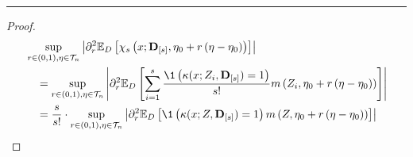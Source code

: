 \hrule

\begin{lem}
    
\end{lem}

\begin{proof}
    \begin{equation}
        \begin{aligned}
            & \sup_{r \in(0,1), \eta \in \mathcal{T}_{n}}\left|
                \partial_r^2 \E_{D}\left[
                    \chi_{s}\left(x; \mathbf{D}_{[s]}, \eta_{0} + r\left(\eta-\eta_{0}\right)\right)
                \right]
            \right| \\
            & \quad = \sup_{r \in(0,1), \eta \in \mathcal{T}_{n}}\left|
                \partial_r^2 \E_{D}\left[
                    \sum_{i = 1}^{s}\frac{\1\left(\kappa(x; Z_{i}, \mathbf{D}_{[s]}) = 1\right)}{s!} 
                    m\left(Z_{i}, \eta_{0} + r\left(\eta-\eta_{0}\right)\right)
                \right]
            \right| \\
            & \quad = \frac{s}{s!} \cdot \sup_{r \in(0,1), \eta \in \mathcal{T}_{n}}\left|
                \partial_r^2 \E_{D}\left[
                    \1\left(\kappa(x; Z, \mathbf{D}_{[s]}) = 1\right) 
                    m\left(Z, \eta_{0} + r\left(\eta-\eta_{0}\right)\right)
                \right]
            \right| \\
        \end{aligned}
    \end{equation}
\end{proof}